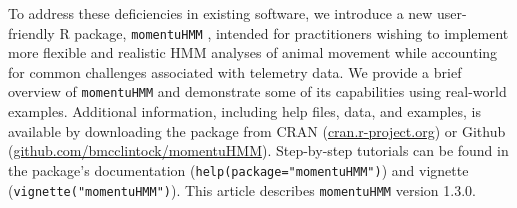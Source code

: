 \documentclass[12pt]{article}\usepackage[]{graphicx}\usepackage[]{color}
\begin{document}
To address these deficiencies in existing software, we introduce a new user-friendly R package, \verb|momentuHMM|%
, intended for practitioners wishing to implement more flexible and realistic HMM analyses of animal movement while accounting for common challenges associated with telemetry data. %
We provide a brief overview of \verb|momentuHMM| and demonstrate some of its capabilities using real-world examples. %
Additional information, including help files, data, and examples, is available by downloading the package from CRAN (\url{cran.r-project.org}) or Github (\url{github.com/bmcclintock/momentuHMM}). Step-by-step tutorials can be found in the package's documentation (\verb|help(package="momentuHMM")|) and vignette (\verb|vignette("momentuHMM")|). This article describes \verb|momentuHMM| version 1.3.0.
\end{document}

